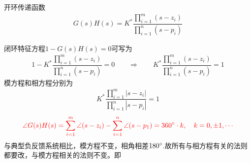 开环传递函数
\begin{align}
	G(s)H(s) = K^*\dfrac{\displaystyle \prod_{i = 1}^{m}(s - z_i)}{\displaystyle \prod_{i = 1}^{n}(s - p_i)}
\end{align}

闭环特征方程$1 - G(s)H(s) = 0$可写为
\begin{align}
	1 - K^*\dfrac{\displaystyle \prod_{i = 1}^{m}(s - z_i)}{\displaystyle \prod_{i = 1}^{n}(s - p_i)} = 0 \quad \quad \Rightarrow \quad \quad K^*\dfrac{\displaystyle \prod_{i = 1}^{m}(s - z_i)}{\displaystyle \prod_{i = 1}^{n}(s - p_i)} = 1
\end{align}
模方程和相方程分别为
\begin{align}
	K^*\dfrac{\displaystyle \prod_{i = 1}^{m}|s - z_i|}{\displaystyle \prod_{i = 1}^{n}|s - p_i|} = 1
\end{align}
\vspace*{-2em}
\begin{align}
	\textcolor{red}{\angle G(s)H(s) = \sum_{i = 1}^{m} \angle(s-z_i) - \sum_{i = 1}^n \angle(s - p_1) = 360{}^{\circ} \cdot k, \quad k = 0, \pm1, \cdots}
\end{align}
与典型负反馈系统相比，模方程不变，相角相差$180{}^{\circ}$.故所有与相方程有关的法则都要改，与模方程相关的法则不变。即

